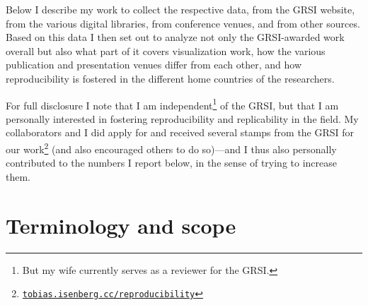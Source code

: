 \documentclass[conference,svgnames]{vgtc}                     %
\begin{document}
\addtocounter{footnote}{-1}
\addtocounter{footnote}{1}

Below I describe my work to collect the respective data, from the GRSI website, from the various digital libraries, from conference venues, and from other sources. Based on this data I then set out to analyze not only the GRSI-awarded work overall but also what part of it covers visualization work, how the various publication and presentation venues differ from each other, and how reproducibility is fostered in the different home countries of the researchers.

For full disclosure I note that I am independent\footnote{But my wife currently serves as a reviewer for the GRSI.} of the GRSI, but that I am personally interested in fostering reproducibility and replicability in the field. My collaborators and I did apply for and received several stamps from the GRSI for our work\footnote{\href{https://tobias.isenberg.cc/reproducibility}{\texttt{tobias.isenberg.cc/reproducibility}}} (and also encouraged others to do so)---and I thus also personally contributed to the numbers I report below, in the sense of trying to increase them.

\section{Terminology and scope}
\label{sec:terminology}
\end{document}
